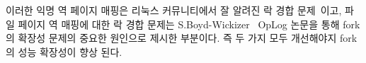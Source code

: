
이러한 익명 역 페이지 매핑은 리눅스 커뮤니티에서 잘 알려진 락 경합
문제~\cite{Andi2011adding}이고, 파일 페이지 역 매핑에 대한 락
경합 문제는 S.Boyd-Wickizer~\cite{SilasBoydWickizerPth} OpLog 논문을 통해
 fork의 확장성 문제의 중요한 원인으로 제시한 부분이다.
즉 두 가지 모두 개선해야지 fork의 성능 확장성이 향상 된다. 



